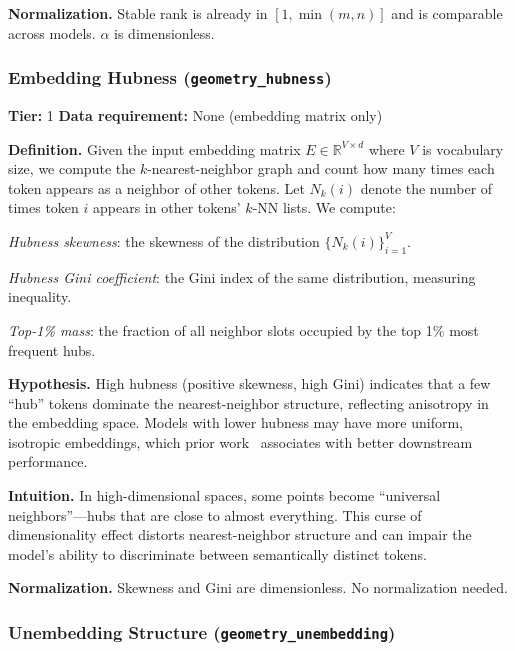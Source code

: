 \documentclass{article}
\begin{document}
\textbf{Normalization.} Stable rank is already in $[1, \min(m,n)]$ and is comparable across models. $\alpha$ is dimensionless.

\subsubsection{Embedding Hubness (\texttt{geometry\_hubness})}
\label{app:hubness}

\textbf{Tier:} 1 \quad \textbf{Data requirement:} None (embedding matrix only)

\textbf{Definition.}
Given the input embedding matrix $E \in \mathbb{R}^{V \times d}$ where $V$ is vocabulary size, we compute the $k$-nearest-neighbor graph and count how many times each token appears as a neighbor of other tokens. Let $N_k(i)$ denote the number of times token $i$ appears in other tokens' $k$-NN lists. We compute:

\emph{Hubness skewness}: the skewness of the distribution $\{N_k(i)\}_{i=1}^{V}$.

\emph{Hubness Gini coefficient}: the Gini index of the same distribution, measuring inequality.

\emph{Top-1\% mass}: the fraction of all neighbor slots occupied by the top 1\% most frequent hubs.

\textbf{Hypothesis.}
High hubness (positive skewness, high Gini) indicates that a few ``hub'' tokens dominate the nearest-neighbor structure, reflecting anisotropy in the embedding space. Models with lower hubness may have more uniform, isotropic embeddings, which prior work~\citep{cai2021isotropy} associates with better downstream performance.

\textbf{Intuition.}
In high-dimensional spaces, some points become ``universal neighbors''---hubs that are close to almost everything. This curse of dimensionality effect distorts nearest-neighbor structure and can impair the model's ability to discriminate between semantically distinct tokens.

\textbf{Normalization.} Skewness and Gini are dimensionless. No normalization needed.

\subsubsection{Unembedding Structure (\texttt{geometry\_unembedding})}
\label{app:unembedding}
\end{document}
